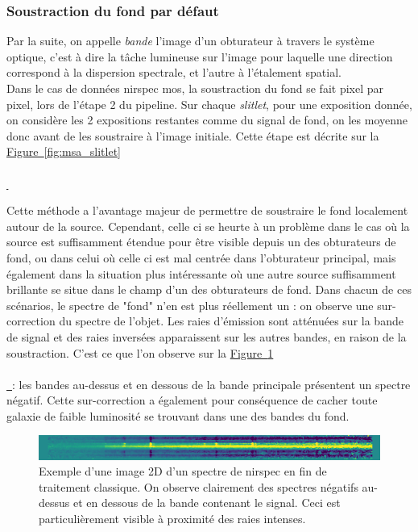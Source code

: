 \documentclass[12pt, a4paper]{article}
\newcommand*{\figref}[2][]{%
  \hyperref[{#2}]{%
    Figure~\ref*{#2}%
    \ifx\\#1\\%
    \else
      \,#1%
    \fi
  }%
}
\begin{document}
  \subsubsection{Soustraction du fond par défaut}

  Par la suite, on appelle \textit{bande} l'image d'un obturateur à travers le système optique, c'est à dire la tâche lumineuse sur l'image pour laquelle une direction correspond à la dispersion spectrale, et l'autre à l'étalement spatial.\\

  Dans le cas de données \gls{nirspec} \gls{mos}, la soustraction du fond se fait pixel par pixel, lors de l'étape 2 du pipeline. Sur chaque \textit{slitlet}, pour une exposition donnée, on considère les 2 expositions restantes comme du signal de fond, on les moyenne donc avant de les soustraire à l'image initiale. Cette étape est décrite sur la \figref{fig:msa_slitlet}

  Cette méthode a l'avantage majeur de permettre de soustraire le fond localement autour de la source. Cependant, celle ci se heurte à un problème dans le cas où la source est suffisamment étendue pour être visible depuis un des obturateurs de fond, ou dans celui où celle ci est mal centrée dans l'obturateur principal, mais également dans la situation plus intéressante où une autre source suffisamment brillante se situe dans le champ d'un des obturateurs de fond. Dans chacun de ces scénarios, le spectre de "fond" n'en est plus réellement un : on observe une sur-correction du spectre de l'objet. Les raies d'émission sont atténuées sur la bande de signal et des raies inversées apparaissent sur les autres bandes, en raison de la soustraction. C'est ce que l'on observe sur la \figref{fig:negative_trace} : les bandes au-dessus et en dessous de la bande principale présentent un spectre négatif. Cette sur-correction a également pour conséquence de cacher toute galaxie de faible luminosité se trouvant dans une des bandes du fond.\\
  
  \begin{figure}[H]
    \centering
    \includegraphics[scale=1.1]{assets/negative_trace_nirspec.png}
    \caption{Exemple d'une image 2D d'un spectre de \gls{nirspec} en fin de traitement classique. On observe clairement des spectres négatifs au-dessus et en dessous de la bande contenant le signal. Ceci est particulièrement visible à proximité des raies intenses.}
    \label{fig:negative_trace}
  \end{figure}
\end{document}
